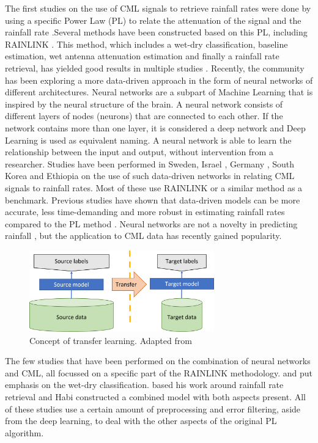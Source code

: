 \documentclass[twocolumn, 10pt, a4paper]{memoir}
\begin{document}
	The first studies on the use of CML signals to retrieve rainfall rates were done by using a specific Power Law (PL) to relate the attenuation of the signal and the rainfall rate .Several methods have been constructed based on this PL, including RAINLINK . This method, which includes a wet-dry classification, baseline estimation, wet antenna attenuation estimation and finally a rainfall rate retrieval, has yielded good results in multiple studies . Recently, the community has been exploring a more data-driven approach in the form of neural networks of different architectures. Neural networks are a subpart of Machine Learning that is inspired by the neural structure of the brain. A neural network consists of different layers of nodes (neurons) that are connected to each other. If the network contains more than one layer, it is considered a deep network and Deep Learning is used as equivalent naming. A neural network is able to learn the relationship between the input and output, without intervention from a researcher. Studies have been performed in Sweden, Israel , Germany , South Korea and Ethiopia \cite{Diba2021} on the use of such data-driven networks in relating CML signals to rainfall rates. Most of these use RAINLINK or a similar method as a benchmark. Previous studies have shown that data-driven models can be more accurate, less time-demanding and more robust in estimating rainfall rates compared to the PL method .  Neural networks are not a novelty in predicting rainfall , but the application to CML data has recently gained popularity.
	
	\begin{figure}[t]
		\includegraphics[width=8cm]{Transfer_learning_concept}
		\caption{Concept of transfer learning. Adapted from \protect\cite{Sarkar2018} }
		\label{fig:transferconcept}
	\end{figure}
	
	The few studies that have been performed on the combination of neural networks and CML, all focussed on a specific part of the RAINLINK methodology.  and  put emphasis on the wet-dry classification.  based his work around rainfall rate retrieval and Habi  constructed a combined model with both aspects present. All of these studies use a certain amount of preprocessing and error filtering, aside from the deep learning, to deal with the other aspects of the original PL algorithm.
	
\end{document}
